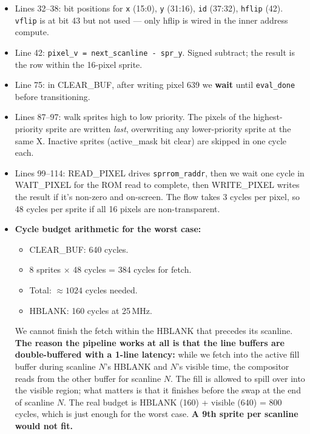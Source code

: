 \documentclass[11pt,letterpaper]{article}
\begin{document}
\begin{itemize}[leftmargin=*]
  \item Lines 32--38: bit positions for \texttt{x} (15:0), \texttt{y}
    (31:16), \texttt{id} (37:32), \texttt{hflip} (42). \texttt{vflip} is at
    bit 43 but not used --- only hflip is wired in the inner address
    compute.
  \item Line 42: \texttt{pixel\_v = next\_scanline - spr\_y}. Signed
    subtract; the result is the row within the 16-pixel sprite.
  \item Line 75: in CLEAR\_BUF, after writing pixel 639 we \textbf{wait}
    until \texttt{eval\_done} before transitioning.
  \item Lines 87--97: walk sprites high to low priority. The pixels of the
    highest-priority sprite are written \emph{last}, overwriting any
    lower-priority sprite at the same X. Inactive sprites (active\_mask
    bit clear) are skipped in one cycle each.
  \item Lines 99--114: READ\_PIXEL drives \texttt{sprrom\_raddr}, then we
    wait one cycle in WAIT\_PIXEL for the ROM read to complete, then
    WRITE\_PIXEL writes the result if it's non-zero and on-screen. The flow
    takes 3 cycles per pixel, so 48 cycles per sprite if all 16 pixels are
    non-transparent.
  \item \textbf{Cycle budget arithmetic for the worst case:}
    \begin{itemize}[leftmargin=*,nosep]
      \item CLEAR\_BUF: 640 cycles.
      \item 8 sprites $\times$ 48 cycles = 384 cycles for fetch.
      \item Total: $\approx 1024$ cycles needed.
      \item HBLANK: 160 cycles at 25\,MHz.
    \end{itemize}
    We cannot finish the fetch within the HBLANK that precedes its
    scanline. \textbf{The reason the pipeline works at all is that the line
    buffers are double-buffered with a 1-line latency:} while we fetch into
    the active fill buffer during scanline $N$'s HBLANK and $N$'s visible
    time, the compositor reads from the other buffer for scanline $N$. The
    fill is allowed to spill over into the visible region; what matters is
    that it finishes before the swap at the end of scanline $N$. The real
    budget is HBLANK (160) + visible (640) = 800 cycles, which is just
    enough for the worst case. \textbf{A 9th sprite per scanline would not
    fit.}
\end{itemize}
\end{document}
